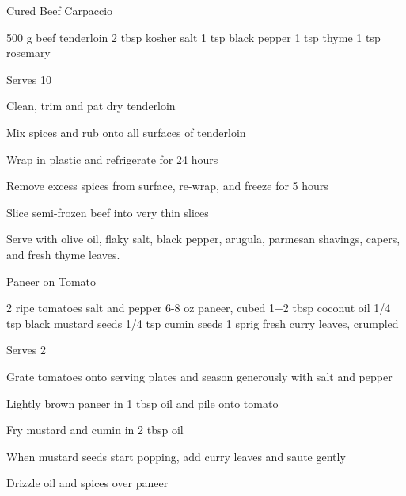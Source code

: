 
\begin{denserecipe}{Cured Beef Carpaccio}{}
\begin{ingredients}
500 g beef tenderloin
2 tbsp kosher salt
1 tsp black pepper
1 tsp thyme
1 tsp rosemary
\end{ingredients}
\nextcolumn
Serves 10
\begin{steps}
\item Clean, trim and pat dry tenderloin
\item Mix spices and rub onto all surfaces of tenderloin
\item Wrap in plastic and refrigerate for 24 hours
\item Remove excess spices from surface, re-wrap, and freeze for 5 hours
\item Slice semi-frozen beef into very thin slices
\end{steps}
Serve with olive oil, flaky salt, black pepper, arugula, parmesan shavings, capers, and fresh thyme leaves.
\end{denserecipe}

\begin{recipe}{Paneer on Tomato}{}
\begin{ingredients}
2 ripe tomatoes
salt and pepper
6-8 oz paneer, cubed
1+2 tbsp coconut oil
1/4 tsp black mustard seeds
1/4 tsp cumin seeds
1 sprig fresh curry leaves, crumpled
\end{ingredients}
\nextcolumn
Serves 2
\begin{steps}
    \item Grate tomatoes onto serving plates and season generously with salt and pepper
    \item Lightly brown paneer in 1 tbsp oil and pile onto tomato
    \item Fry mustard and cumin in 2 tbsp oil
    \item When mustard seeds start popping, add curry leaves and saute gently
    \item Drizzle oil and spices over paneer
\end{steps}
\end{recipe}

